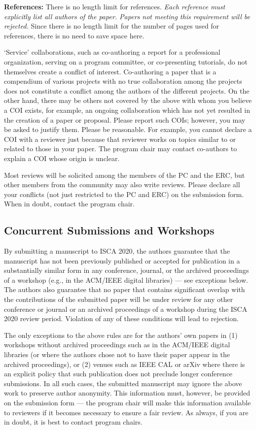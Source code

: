 \documentclass[conference]{IEEEtran}
\begin{document}
\noindent\textbf{References:}  There is no length limit for
references. {\em Each reference must explicitly list all authors of
  the paper.  Papers not meeting this requirement will be rejected.}
Since there is no length limit for the number of pages
used for references, there is no need to save space here. 


`Service' collaborations, such as co-authoring a report for a
professional organization, serving on a program committee, or
co-presenting tutorials, do not themselves create a conflict of
interest. Co-authoring a paper that is a compendium of various
projects with no true collaboration among the projects does not
constitute a conflict among the authors of the different projects. On
the other hand, there may be others not covered by the above with whom
you believe a COI exists, for example, an ongoing collaboration which
has not yet resulted in the creation of a paper or proposal. Please
report such COIs; however, you may be asked to justify them. Please be
reasonable. For example, you cannot declare a COI with a reviewer just
because that reviewer works on topics similar to or related to those
in your paper.  The program chair may contact co-authors to explain a COI
whose origin is unclear. 

Most reviews will be solicited among the members of the PC and the ERC, but other
members from the community may also write reviews. Please declare all
your conflicts (not just restricted to the PC and ERC) on the
submission form. When in doubt, contact the program chair. 


\subsection{Concurrent Submissions and Workshops}
By submitting a manuscript to ISCA 2020, the authors guarantee that
the manuscript has not been previously published or accepted for
publication in a substantially similar form in any conference,
journal, or the archived proceedings of a workshop (e.g., in the
ACM/IEEE digital libraries) --- see exceptions below. The authors also
guarantee that no paper that contains significant overlap with the
contributions of the submitted paper will be under review for any
other conference or journal or an archived proceedings of a workshop
during the ISCA 2020 review period. Violation of any of these
conditions will lead to rejection. 

The only exceptions to the above rules are for the authors' own papers
in (1) workshops without archived proceedings such as in the ACM/IEEE
digital libraries (or where the authors chose not to have their paper
appear in the archived proceedings), or (2) venues such as IEEE CAL or
arXiv where there is an explicit policy that such publication does not
preclude longer conference submissions.  In all such cases, the
submitted manuscript may ignore the above work to preserve author
anonymity. This information must, however, be provided on the
submission form --- the program chair will make this information available
to reviewers if it becomes necessary to ensure a fair review.  As
always, if you are in doubt, it is best to contact program chairs. 
\end{document}
